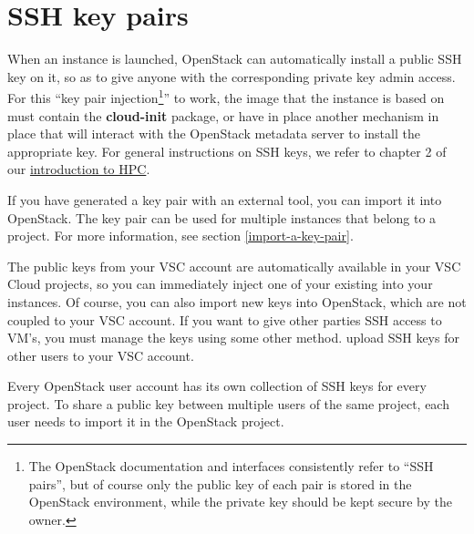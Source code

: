 \section{SSH key pairs}\label{sec:ssh-key-pairs}
When an instance is launched, OpenStack can automatically install a
public SSH key on it, so as to give anyone with the corresponding
private key admin access.  For this ``key pair injection\footnote{The
  OpenStack documentation and interfaces consistently refer to ``SSH
  pairs'', but of course only the public key of each pair is stored in
  the OpenStack environment, while the private key should be kept
  secure by the owner.}'' to work, the image that the instance is
based on must contain the \textbf{cloud-init} package, or have in
place another mechanism in place that will interact with the OpenStack
metadata server to install the appropriate key.  For general
instructions on SSH keys, we refer to chapter 2 of our
\href{https://hpcugent.github.io/vsc\_user\_docs}{introduction to
  HPC}.

If you have generated a key pair with an external tool, you can import
it into OpenStack. The key pair can be used for multiple instances
that belong to a project. For more information, see section
\ref{import-a-key-pair}.

 The public keys from your VSC account are automatically
available in your VSC Cloud projects, so you can immediately inject
one of your existing into your instances.  Of course, you can also
import new keys into OpenStack, which are not coupled to your VSC
account.  If you want to give other parties SSH access to VM's, you
must manage the keys using some other method.   upload
SSH keys for other users to your VSC account.

 Every OpenStack user account has its own collection of
SSH keys for every project.  To share a public key between multiple
users of the same project, each user needs to import it in the
OpenStack project.

